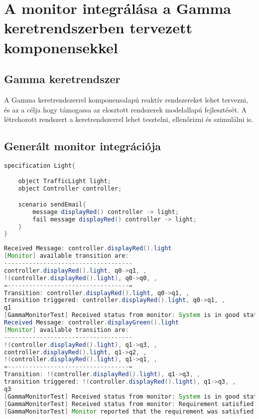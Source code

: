 \chapter{A monitor integrálása a Gamma keretrendszerben tervezett komponensekkel}

\section{Gamma keretrendszer}

A Gamma keretrendszerrel komponensalapú reaktív rendszereket lehet tervezni, és az a célja hogy támogassa az elosztott rendszerek modelallapú fejlesztését.
A létrehozott rendszert a keretrendszerrel lehet tesztelni, ellenőrizni és szimulálni is.

\clearpage\section{Generált monitor integrációja}

\begin{lstlisting}[language=java, frame=single, float=ht!, caption={Szenárió szöveges leírása.},captionpos=b]
specification Light{

    object TrafficLight light;
    object Controller controller;

    scenario sendEmail{
        message displayRed() controller -> light;
        fail message displayRed() controller -> light;
    }
}
\end{lstlisting}

\begin{lstlisting}[language=java, frame=single, float=ht!, caption={Szenárió szöveges leírása.},captionpos=b]
Received Message: controller.displayRed().light
[Monitor] available transition are: 
------------------------------------
controller.displayRed().light, q0->q1, , 
!(controller.displayRed().light), q0->q0, , 
=----------------------------------=
Transition: controller.displayRed().light, q0->q1, , 
transition triggered: controller.displayRed().light, q0->q1, , 
q1
[GammaMonitorTest] Received status from monitor: System is in good state.
Received Message: controller.displayGreen().light
[Monitor] available transition are: 
------------------------------------
!(controller.displayRed().light), q1->q3, , 
controller.displayRed().light, q1->q2, , 
!(controller.displayRed().light), q1->q1, , 
=----------------------------------=
Transition: !(controller.displayRed().light), q1->q3, , 
transition triggered: !(controller.displayRed().light), q1->q3, , 
q3
[GammaMonitorTest] Received status from monitor: System is in good state.
[GammaMonitorTest] Received status from monitor: Requirement satisfied
[GammaMonitorTest] Monitor reported that the requirement was satisfied
\end{lstlisting}